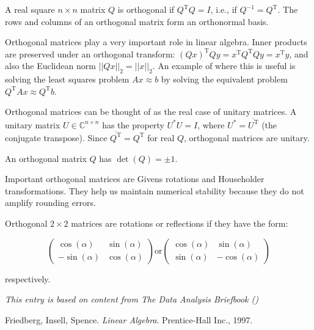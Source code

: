 \documentclass{article}
\newcommand{\trT}{{\mathrm T}}
\begin{document}
A real square $n \times n$ matrix $Q$ is orthogonal if $Q^\trT Q = I$, i.e., if $Q^{-1} = Q^\trT$.  The rows and columns of an orthogonal matrix form an orthonormal basis.

Orthogonal matrices play a very important role in linear algebra.  Inner products are preserved under an orthogonal transform: $(Qx)^\trT Qy=x^\trT Q^\trT Qy=x^\trT y$, and also the Euclidean norm $||Qx||_2 = ||x||_2$.  An example of where this is useful is solving the least squares problem $Ax \approx b$ by solving the equivalent problem $Q^\trT Ax \approx Q^\trT b$.

Orthogonal matrices can be thought of as the real case of unitary matrices.  A unitary matrix $U \in \mathbb{C}^{n \times n}$ has the property $U^*U = I$, where $U^* = \overline{U^\trT}$ (the conjugate transpose).  Since $\overline{Q^\trT} = Q^\trT$ for real $Q$, orthogonal matrices are unitary.

An orthogonal matrix $Q$ has $\det(Q) = \pm 1$.

Important orthogonal matrices are Givens rotations and Householder transformations.  They help us maintain numerical stability because they do not amplify rounding errors.

Orthogonal $2 \times 2$ matrices are rotations or reflections if they have the form:

$$ \begin{pmatrix} \cos(\alpha) & \sin(\alpha) \\ -\sin(\alpha) & \cos(\alpha) \end{pmatrix}  \text{or} \begin{pmatrix} \cos(\alpha) & \sin(\alpha) \\ \sin(\alpha) & -\cos(\alpha) \end{pmatrix} $$

respectively.

{\it This entry is based on content from The Data Analysis Briefbook ()}
\begin{thebibliography}{3}

 Friedberg, Insell, Spence. {\it Linear Algebra}. Prentice-Hall Inc., 1997.

\end{thebibliography}
\end{document}
